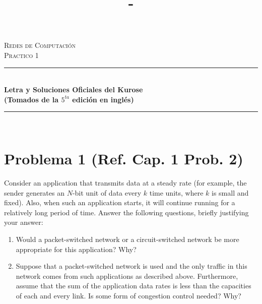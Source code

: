 \documentclass[10pt,spanish]{article}
\title{\Practico - \Titulo}
\newcommand{\Practico}{Practico 1}
\newcommand{\Titulo}{Letra y Soluciones Oficiales del Kurose}
\newcommand{\Materia}{Redes de Computación}
\numberwithin{figure}{section} %
\begin{document}
\vspace*{\fill}
\begin{center}																		%
\newcommand{\HRule}{\rule{\linewidth}{0.5mm}}							
\textsc{\huge \Materia}\\[1.5cm]	

\textsc{\huge \Practico				%
}\\[1.5cm]													%

\vspace*{5cm}																		%
\HRule \\[0.4cm]																	%
{ \huge \bfseries \Titulo \\ \Large(Tomados de la $5^{ta}$ edición en inglés)}\\[0.3cm]	%
\HRule \\[4cm]																	%
																		
\end{center}							 								\vspace*{\fill}		
																					
\newpage
\tableofcontents

\newpage
\section[Problema 1]{Problema 1 \textnormal{\Large{(Ref. Cap. 1 Prob. 2)}}}
Consider an application that transmits data at a steady rate (for example, the sender generates an $N$-bit unit of data every $k$ time units, where $k$ is small and fixed). Also, when such an application starts, it will continue running for a relatively long period of time. Answer the following questions, briefly justifying your answer:

\renewcommand{\theenumi}{\alph{enumi}} %
\begin{enumerate}
\item Would a packet-switched network or a circuit-switched network be more appropriate for this application? Why?
\item Suppose that a packet-switched network is used and the only traffic in this network comes from such applications as described above. Furthermore, assume that the sum of the application data rates is less than the capacities of each and every link. Is some form of congestion control needed? Why?
\end{enumerate}
\end{document}
